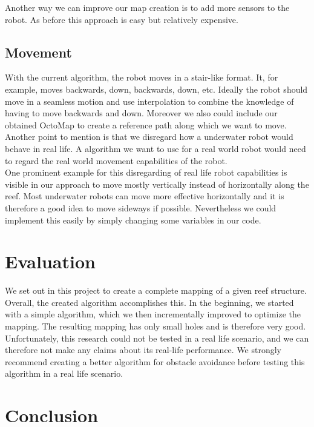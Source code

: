 \documentclass[twoside, 12pt]{article}
\begin{document}
Another way we can improve our map creation is to add more sensors to the robot. As before this approach is easy but relatively expensive.\\

\subsection{Movement}
With the current algorithm, the robot moves in a stair-like format. It, for example, moves backwards, down, backwards, down, etc. Ideally the robot should move in a seamless motion and use interpolation to combine the knowledge of having to move backwards and down. Moreover we also could include our obtained OctoMap to create a reference path along which we want to move. Another point to mention is that we disregard how a underwater robot would behave in real life. A algorithm we want to use for a real world robot would need to regard the real world movement capabilities of the robot. \\

One prominent example for this disregarding of real life robot capabilities is visible in our approach to move mostly vertically instead of horizontally along the reef. Most underwater robots can move more effective horizontally and it is therefore a good idea to move sideways if possible. Nevertheless we could implement this easily by simply changing some variables in our code.\\ 

\section{Evaluation}
\label{sec:eval}

We set out in this project to create a complete mapping of a given reef structure. Overall, the created algorithm accomplishes this. In the beginning, we started with a simple algorithm, which we then incrementally improved to optimize the mapping. The resulting mapping has only small holes and is therefore very good.\\

Unfortunately, this research could not be tested in a real life scenario, and we can therefore not make any claims about its real-life performance. We strongly recommend creating a better algorithm for obstacle avoidance before testing this algorithm in a real life scenario.\\

\section{Conclusion}
\label{sec:conclusion}
\end{document}
